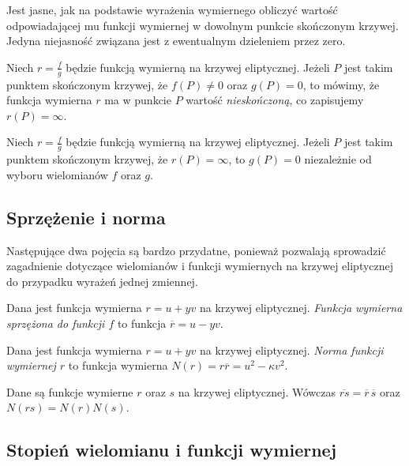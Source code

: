 Jest jasne, jak na podstawie wyrażenia wymiernego
obliczyć wartość odpowiadającej mu funkcji wymiernej
w dowolnym punkcie skończonym krzywej.
Jedyna niejasność związana jest z ewentualnym dzieleniem przez zero.

\begin{definition}
Niech $r = \frac{f}{g}$ będzie funkcją wymierną na krzywej eliptycznej.
Jeżeli $P$ jest takim punktem skończonym krzywej,
że $f(P) \neq 0$ oraz $g(P) = 0$,
to mówimy, że funkcja wymierna $r$ ma w punkcie $P$
wartość \emph{nieskończoną},
co zapisujemy $r(P) = \infty$.
\end{definition}

\begin{theorem}
Niech $r = \frac{f}{g}$ będzie funkcją wymierną na krzywej eliptycznej.
Jeżeli $P$ jest takim punktem skończonym krzywej,
że $r(P) = \infty$,
to $g(P) = 0$ niezależnie od wyboru wielomianów $f$ oraz $g$.
\end{theorem}

\subsection*{Sprzężenie i norma}

Następujące dwa pojęcia są bardzo przydatne,
ponieważ pozwalają sprowadzić
zagadnienie dotyczące wielomianów i funkcji wymiernych na krzywej eliptycznej
do przypadku wyrażeń jednej zmiennej.

\begin{definition}
Dana jest funkcja wymierna $r = u + yv$ na krzywej eliptycznej.
\emph{Funkcja wymierna sprzężona do funkcji $f$}
to funkcja $\overline{r} = u - yv$.
\end{definition}

\begin{definition}
Dana jest funkcja wymierna $r = u + yv$ na krzywej eliptycznej.
\emph{Norma funkcji wymiernej $r$}
to funkcja wymierna $N(r) = r\overline{r} = u^2 - \kappa v^2$.
\end{definition}

\begin{fact}
Dane są funkcje wymierne $r$ oraz $s$ na krzywej eliptycznej.
Wówczas $\overline{rs} = \overline{r}\,\overline{s}$
oraz $N(rs) = N(r)N(s)$.
\end{fact}

\subsection*{Stopień wielomianu i funkcji wymiernej}

